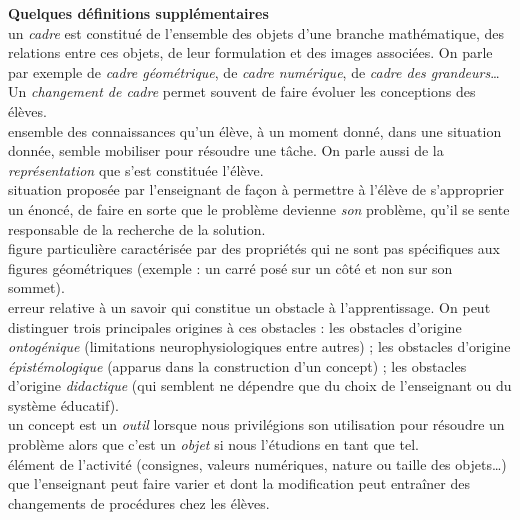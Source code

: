{\bf Quelques définitions supplémentaires} \\ [1mm]
 un \textit{cadre} est constitué de l'ensemble des objets d'une branche mathématique, des relations entre ces objets, de leur formulation et des images associées. On parle par exemple de \textit{cadre géométrique}, de \textit{cadre numérique}, de \textit{cadre des grandeurs}\ldots Un \textit{changement de cadre} permet souvent de faire évoluer les conceptions des élèves. \\ [1.5mm]
 ensemble des connaissances qu'un élève, à un moment donné, dans une situation donnée, semble mobiliser pour résoudre une tâche. On parle aussi de la \textit{représentation} que s'est constituée l'élève. \\ [1.5mm]
 situation proposée par l'enseignant de façon à permettre à l'élève de s'approprier un énoncé, de faire en sorte que le problème devienne \textit{son} problème, qu'il se sente responsable de la recherche de la solution. \\ [1.5mm]
 figure particulière caractérisée par des propriétés qui ne sont pas spécifiques aux figures géométriques (exemple : un carré \og posé \fg{} sur un côté et non sur son sommet). \\ [1mm]
 erreur relative à un savoir qui constitue un obstacle à l'apprentissage. On peut distinguer trois principales origines à ces obstacles : les obstacles d'origine {\it ontogénique} (limitations neurophysiologiques entre autres) ; les obstacles d'origine {\it épistémologique} (apparus dans la construction d'un concept) ; les obstacles d'origine {\it didactique} (qui semblent ne dépendre que du choix  de l'enseignant ou du système éducatif). \\ [1.5mm]
 un concept est un \textit{outil} lorsque nous privilégions son utilisation pour résoudre un problème alors que c'est un \textit{objet} si nous l'étudions en tant que tel. \\ [1mm]
 élément de l'activité (consignes, valeurs numériques, nature ou taille des objets\dots) que l'enseignant peut faire varier et dont la modification peut entraîner des changements de procédures chez les élèves.


